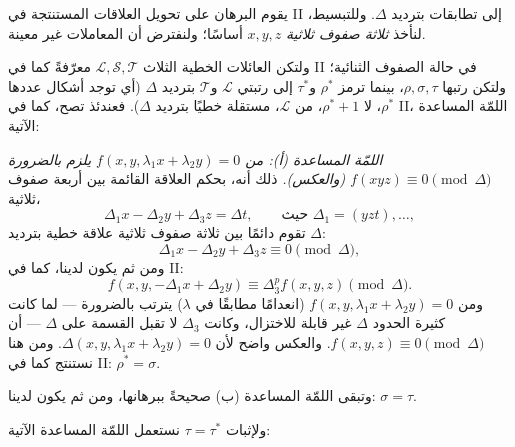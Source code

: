 \documentclass[11pt]{article}
\begin{document}
يقوم البرهان على تحويل العلاقات المستنتجة في II إلى تطابقات بترديد $\Delta$. وللتبسيط، لنأخذ \emph{ثلاثة صفوف ثلاثية} $x,y,z$ أساسًا؛ ولنفترض أن المعاملات غير معينة.

ولتكن العائلات الخطية الثلاث $\mathcal L,\mathcal S,\mathcal T$ معرّفةً كما في II في حالة الصفوف الثنائية؛ ولتكن رتبها $\rho,\sigma,\tau$، بينما ترمز $\rho^*$ و$\tau^*$ إلى رتبتي $\mathcal L$ و$\mathcal T$ بترديد $\Delta$ (أي توجد أشكال عددها $\rho^*$، لا $\rho^*+1$، من $\mathcal L$، مستقلة خطيًا بترديد $\Delta$). فعندئذ تصح، كما في II، اللمّة المساعدة الآتية:

\emph{اللمّة المساعدة (أ): من $f(x,y,\lambda_1x+\lambda_2y)=0$ يلزم بالضرورة $f(xyz)\equiv0\pmod{\Delta}$ (والعكس).} ذلك أنه، بحكم العلاقة القائمة بين أربعة صفوف ثلاثية،
\[
  \Delta_1x-\Delta_2y+\Delta_3z=\Delta t,
  \qquad \text{حيث }\Delta_1=(yzt),\ldots,
\]
تقوم دائمًا بين ثلاثة صفوف ثلاثية علاقة خطية بترديد $\Delta$:
\[
  \Delta_1x-\Delta_2y+\Delta_3z\equiv0\pmod{\Delta},
\]
ومن ثم يكون لدينا، كما في II:
\[
  f(x,y,-\Delta_1x+\Delta_2y)\equiv\Delta_3^p f(x,y,z)\pmod{\Delta}.
\]
ومن $f(x,y,\lambda_1x+\lambda_2y)=0$ (انعدامًا مطابقًا في $\lambda$) يترتب بالضرورة — لما كانت كثيرة الحدود $\Delta$ غير قابلة للاختزال، وكانت $\Delta_3$ لا تقبل القسمة على $\Delta$ — أن $f(x,y,z)\equiv0\pmod{\Delta}$. والعكس واضح لأن $\Delta(x,y,\lambda_1x+\lambda_2y)=0$. ومن هنا نستنتج كما في II: $\rho^*=\sigma$.

وتبقى اللمّة المساعدة (ب) صحيحةً ببرهانها، ومن ثم يكون لدينا: $\sigma=\tau$.

ولإثبات $\tau=\tau^*$ نستعمل اللمّة المساعدة الآتية:
\end{document}
